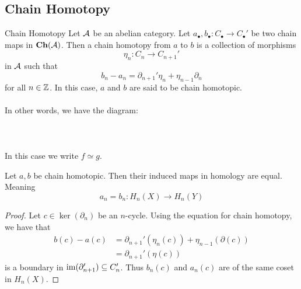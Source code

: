 \documentclass[a4paper]{article}
\begin{document}
\subsection{Chain Homotopy}
\begin{defn}{Chain Homotopy}{} Let $\mathcal{A}$ be an abelian category. Let $a_\bullet,b_\bullet:C_\bullet\to C_\bullet'$ be two chain maps in $\bold{Ch}(\mathcal{A})$. Then a chain homotopy from $a$ to $b$ is a collection of morphisms $$\eta_n:C_n\to C_{n+1}'$$ in $\mathcal{A}$ such that $$b_n-a_n=\partial_{n+1}'\eta_n+\eta_{n-1}\partial_n$$ for all $n\in\mathbb{Z}$. In this case, $a$ and $b$ are said to be chain homotopic. \\~\\
In other words, we have the diagram: \\~\\
\\~\\

In this case we write $f\simeq g$. 
\end{defn}

\begin{lmm}{}{} Let $a,b$ be chain homotopic. Then their induced maps in homology are equal. Meaning $$a_n=b_n:H_n(X)\to H_n(Y)$$ \tcbline
\begin{proof}
Let $c\in\ker(\partial_n)$ be an $n$-cycle. Using the equation for chain homotopy, we have that 
\begin{align*}
b(c)-a(c)&=\partial_{n+1}'(\eta_n(c))+\eta_{n-1}(\partial(c))\\
&=\partial_{n+1}'(\eta(c))
\end{align*}
 is a boundary in $\operatorname{im}(\partial_{n+1}')\subseteq C_n'$. Thus $b_n(c)$ and $a_n(c)$ are of the same coset in $H_n(X)$. 
\end{proof}
\end{lmm}
\end{document}

